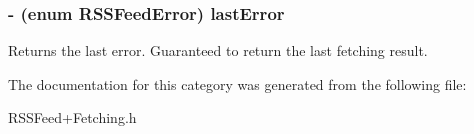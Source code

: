 \subsubsection{\setlength{\rightskip}{0pt plus 5cm}- (enum RSSFeed\-Error) last\-Error }\label{categoryRSSFeed(Fetching)_bc5932a5df8233857ffb8f3f802792b6}


Returns the last error. Guaranteed to return the last fetching result. 

The documentation for this category was generated from the following file:\begin{CompactItemize}
\item 
RSSFeed+Fetching.h\end{CompactItemize}
